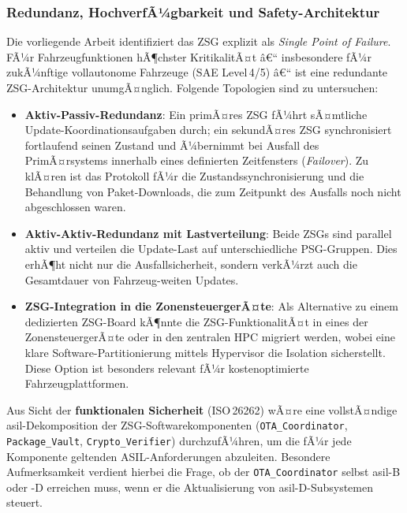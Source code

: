 ﻿\documentclass[12pt,a4paper,twoside]{article}
\begin{document}
\subsubsection{Redundanz, HochverfÃ¼gbarkeit und Safety-Architektur}

Die vorliegende Arbeit identifiziert das ZSG explizit als
\emph{Single Point of Failure}. FÃ¼r Fahrzeugfunktionen hÃ¶chster
KritikalitÃ¤t â€“ insbesondere fÃ¼r zukÃ¼nftige vollautonome Fahrzeuge
(SAE Level\,4/5) â€“ ist eine redundante ZSG-Architektur unumgÃ¤nglich.
Folgende Topologien sind zu untersuchen:

\begin{itemize}
  \item \textbf{Aktiv-Passiv-Redundanz}: Ein primÃ¤res ZSG fÃ¼hrt sÃ¤mtliche
    Update-Koordina\-tions\-aufgaben durch; ein sekundÃ¤res ZSG synchronisiert
    fortlaufend seinen Zustand und Ã¼bernimmt bei Ausfall des PrimÃ¤rsystems
    innerhalb eines definierten Zeitfensters (\textit{Failover}).
    Zu klÃ¤ren ist das Protokoll fÃ¼r die Zustandssynchronisierung und
    die Behandlung von Paket-Downloads, die zum Zeitpunkt des Ausfalls
    noch nicht abgeschlossen waren.
  \item \textbf{Aktiv-Aktiv-Redundanz mit Lastverteilung}: Beide ZSGs
    sind parallel aktiv und verteilen die Update-Last auf unterschiedliche
    PSG-Gruppen. Dies erhÃ¶ht nicht nur die Ausfallsicherheit, sondern
    verkÃ¼rzt auch die Gesamtdauer von Fahrzeug-weiten Updates.
  \item \textbf{ZSG-Integration in die ZonensteuergerÃ¤te}: Als
    Alternative zu einem dedizierten ZSG-Board kÃ¶nnte die
    ZSG-FunktionalitÃ¤t in eines der ZonensteuergerÃ¤te oder in den
    zentralen HPC migriert werden, wobei eine klare
    Software-Partitionierung mittels Hypervisor die Isolation
    sicherstellt. Diese Option ist besonders relevant fÃ¼r
    kostenoptimierte Fahrzeugplattformen.
\end{itemize}

Aus Sicht der \textbf{funktionalen Sicherheit} (ISO\,26262) wÃ¤re eine
vollstÃ¤ndige \gls{asil}-Dekomposition der ZSG-Softwarekomponenten
(\texttt{OTA\_Coordinator}, \texttt{Package\_Vault}, \texttt{Cryp\newline to\_Verifier}) durchzufÃ¼hren, um die fÃ¼r jede Komponente
geltenden ASIL-Anforderungen abzuleiten. Besondere Aufmerksamkeit verdient
hierbei die Frage, ob der \texttt{OTA\_Coordinator} selbst
\gls{asil}-B oder -D erreichen muss, wenn er die Aktualisierung
von \gls{asil}-D-Subsystemen steuert.
\end{document}

